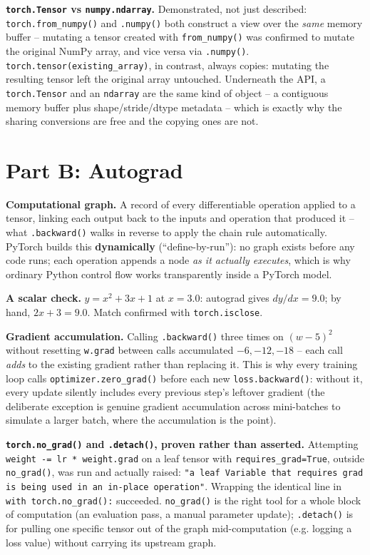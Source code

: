 \documentclass[11pt,a4paper]{article}
\begin{document}
\textbf{\texttt{torch.Tensor} vs \texttt{numpy.ndarray}.} Demonstrated, not just
described: \texttt{torch.from\_numpy()} and \texttt{.numpy()} both construct a view over
the \emph{same} memory buffer -- mutating a tensor created with \texttt{from\_numpy()}
was confirmed to mutate the original NumPy array, and vice versa via \texttt{.numpy()}.
\texttt{torch.tensor(existing\_array)}, in contrast, always copies: mutating the
resulting tensor left the original array untouched. Underneath the API, a
\texttt{torch.Tensor} and an \texttt{ndarray} are the same kind of object -- a
contiguous memory buffer plus shape/stride/dtype metadata -- which is exactly why the
sharing conversions are free and the copying ones are not.

\section*{Part B: Autograd}

\textbf{Computational graph.} A record of every differentiable operation applied to a
tensor, linking each output back to the inputs and operation that produced it -- what
\texttt{.backward()} walks in reverse to apply the chain rule automatically. PyTorch
builds this \textbf{dynamically} (``define-by-run''): no graph exists before any code
runs; each operation appends a node \emph{as it actually executes}, which is why
ordinary Python control flow works transparently inside a PyTorch model.

\textbf{A scalar check.} $y = x^2 + 3x + 1$ at $x=3.0$: autograd gives
$dy/dx = 9.0$; by hand, $2x+3 = 9.0$. Match confirmed with \texttt{torch.isclose}.

\textbf{Gradient accumulation.} Calling \texttt{.backward()} three times on
$(w-5)^2$ without resetting \texttt{w.grad} between calls accumulated $-6, -12, -18$ --
each call \emph{adds} to the existing gradient rather than replacing it. This is why
every training loop calls \texttt{optimizer.zero\_grad()} before each new
\texttt{loss.backward()}: without it, every update silently includes every previous
step's leftover gradient (the deliberate exception is genuine gradient accumulation
across mini-batches to simulate a larger batch, where the accumulation is the point).

\textbf{\texttt{torch.no\_grad()} and \texttt{.detach()}, proven rather than asserted.}
Attempting \texttt{weight -= lr * weight.grad} on a leaf tensor with
\texttt{requires\_grad=True}, outside \texttt{no\_grad()}, was run and actually raised:
\texttt{"a leaf Variable that requires grad is being used in an in-place operation"}.
Wrapping the identical line in \texttt{with torch.no\_grad():} succeeded. \texttt{no\_grad()}
is the right tool for a whole block of computation (an evaluation pass, a manual
parameter update); \texttt{.detach()} is for pulling one specific tensor out of the
graph mid-computation (e.g. logging a loss value) without carrying its upstream graph.
\end{document}
